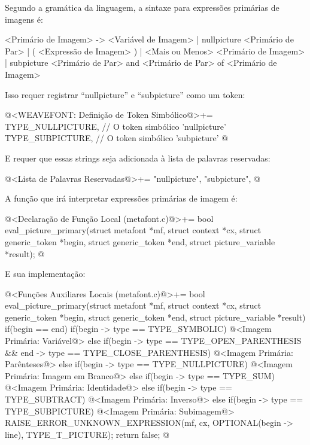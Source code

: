 {{{{{{

Segundo a gramática da linguagem, a sintaxe para expressões primárias
de imagens é:

\alinhaverbatim
<Primário de Imagem> -> <Variável de Imagem> |
                        nullpicture <Primário de Par> |
                        ( <Expressão de Imagem> ) |
                        <Mais ou Menos> <Primário de Imagem> |
                        subpicture <Primário de Par> and <Primário de Par> of
                                   <Primário de Imagem>
\alinhanormal

Isso requer registrar ``nullpicture'' e ``subpicture'' como um token:

\iniciocodigo
@<WEAVEFONT: Definição de Token Simbólico@>+=
TYPE_NULLPICTURE,        // O token simbólico 'nullpicture'
TYPE_SUBPICTURE,         // O token simbólico 'subpicture'
@
\fimcodigo

E requer que essas strings seja adicionada à lista de palavras reservadas:

\iniciocodigo
@<Lista de Palavras Reservadas@>+=
"nullpicture", "subpicture",
@
\fimcodigo

A função que irá interpretar expressões primárias de imagem é:

\iniciocodigo
@<Declaração de Função Local (metafont.c)@>+=
bool eval_picture_primary(struct metafont *mf, struct context *cx,
                          struct generic_token *begin,
                          struct generic_token *end,
                          struct picture_variable *result);
@
\fimcodigo

E sua implementação:

\iniciocodigo
@<Funções Auxiliares Locais (metafont.c)@>+=
bool eval_picture_primary(struct metafont *mf, struct context *cx,
                         struct generic_token *begin,
                         struct generic_token *end,
                         struct picture_variable *result){
  if(begin == end){
    if(begin -> type == TYPE_SYMBOLIC){
      @<Imagem Primária: Variável@>
    }
  }
  else{
    if(begin -> type == TYPE_OPEN_PARENTHESIS &&
      end -> type == TYPE_CLOSE_PARENTHESIS){
      @<Imagem Primária: Parênteses@>
    }
    else if(begin -> type == TYPE_NULLPICTURE){
      @<Imagem Primária: Imagem em Branco@>
    }
    else if(begin -> type == TYPE_SUM){
      @<Imagem Primária: Identidade@>
    }
    else if(begin -> type == TYPE_SUBTRACT){
      @<Imagem Primária: Inverso@>
    }
    else if(begin -> type == TYPE_SUBPICTURE){
      @<Imagem Primária: Subimagem@>
    }
  }
  RAISE_ERROR_UNKNOWN_EXPRESSION(mf, cx, OPTIONAL(begin -> line),
                                 TYPE_T_PICTURE);
  return false;
}
@
\fimcodigo

}}}}}}
